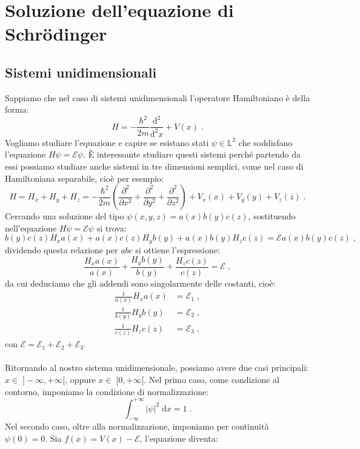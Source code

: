 \documentclass[12pt,a4paper]{report}
\theoremstyle{definition}
\numberwithin{equation}{section}
\newcommand{\diff}[1][]{\mathrm{d}#1}
\begin{document}
\chapter{Soluzione dell'equazione di Schrödinger}
\section{Sistemi unidimensionali}
Sappiamo che nel caso di sistemi unidimensionali l'operatore Hamiltoniano è della forma:
\begin{equation}
H=-\frac{\hbar^2}{2m}\frac{\mathrm{d}^2}{\diff^2{x}}+V(x)\;.
\end{equation}
Vogliamo studiare l'equazione e capire se esistano stati $\psi\in\mathbb{L}^2$ che soddisfano l'equazione $H\psi=\mathcal{E}\psi$. È interessante studiare questi sistemi perché partendo da essi possiamo studiare anche sistemi in tre dimensioni semplici, come nel caso di Hamiltoniana separabile, cioè per esempio:
\begin{equation}
H=H_x+H_y+H_z=-\frac{\hbar^2}{2m}\left(\frac{\partial^2}{\partial x^2}+\frac{\partial^2}{\partial y^2}+\frac{\partial^2}{\partial z^2}\right)+V_x(x)+V_y(y)+V_z(z)\;.
\end{equation}
Cercando una soluzione del tipo $\psi(x,y,z)=a(x)b(y)c(z)$, sostituendo nell'equazione $H\psi=\mathcal{E}\psi$ si trova:
$$
b(y)c(z)H_x a(x)+a(x)c(z)H_y b(y)+a(x)b(y)H_z c(z)=\mathcal{E}a(x)b(y)c(z)\;,
$$
dividendo questa relazione per $abc$ si ottiene l'espressione:
\begin{equation}
\frac{H_x a(x)}{a(x)}+\frac{H_y b(y)}{b(y)}+\frac{H_z c(z)}{c(z)}=\mathcal{E}\;,
\end{equation}
da cui deduciamo che gli addendi sono singolarmente delle costanti, cioè:
\begin{align*}
\frac{1}{a(x)}H_xa(x) &=\mathcal{E}_1\;, \\
\frac{1}{b(y)}H_yb(y) &=\mathcal{E}_2\;, \\
\frac{1}{c(z)}H_zc(z) &= \mathcal{E}_3\;,
\end{align*}
con $\mathcal{E}=\mathcal{E}_1+\mathcal{E}_2+\mathcal{E}_3$. \\
\\
Ritornando al nostro sistema unidimensionale, possiamo avere due casi principali: $x\in\;]-\infty,+\infty[$, oppure $x\in\;[0,+\infty[$. Nel primo caso, come condizione al contorno, imponiamo la condizione di normalizzazione:
$$
\int_{-\infty}^{+\infty} |\psi|^2\;\diff{x}=1\;.
$$
Nel secondo caso, oltre alla normalizzazione, imponiamo per continuità $\psi(0)=0$. Sia $f(x)=V(x)-\mathcal{E}$, l'equazione diventa:
\end{document}
